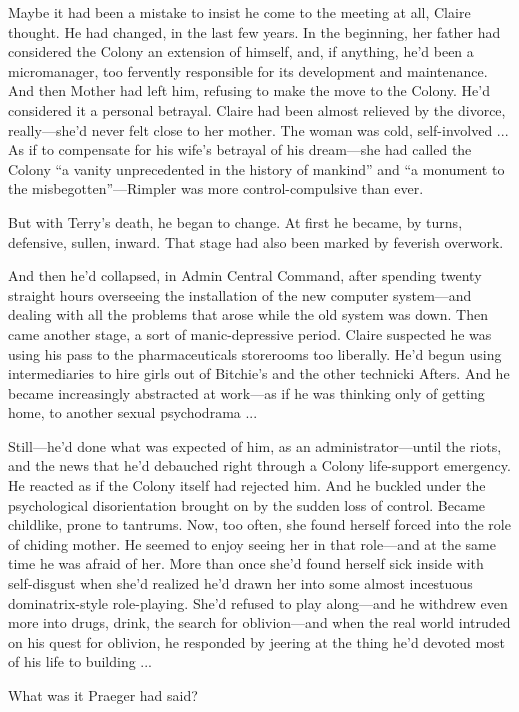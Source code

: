 Maybe it had been a mistake to insist he come to the meeting at all, Claire thought. He had changed, in the last few years. In the beginning, her father had considered the Colony an extension of himself, and, if anything, he'd been a micromanager, too fervently responsible for its development and maintenance. And then Mother had left him, refusing to make the move to the Colony. He'd considered it a personal betrayal. Claire had been almost relieved by the divorce, really—she'd never felt close to her mother. The woman was cold, self-involved ... As if to compensate for his wife's betrayal of his dream—she had called the Colony ``a vanity unprecedented in the history of mankind'' and ``a monument to the misbegotten''—Rimpler was more control-compulsive than ever.

But with Terry's death, he began to change. At first he became, by turns, defensive, sullen, inward. That stage had also been marked by feverish overwork.

And then he'd collapsed, in Admin Central Command, after spending twenty straight hours overseeing the installation of the new computer system—and dealing with all the problems that arose while the old system was down. Then came another stage, a sort of manic-depressive period. Claire suspected he was using his pass to the pharmaceuticals storerooms too liberally. He'd begun using intermediaries to hire girls out of Bitchie's and the other technicki Afters. And he became increasingly abstracted at work—as if he was thinking only of getting home, to another sexual psychodrama ...

Still—he'd done what was expected of him, as an administrator—until the riots, and the news that he'd debauched right through a Colony life-support emergency. He reacted as if the Colony itself had rejected him. And he buckled under the psychological disorientation brought on by the sudden loss of control. Became childlike, prone to tantrums. Now, too often, she found herself forced into the role of chiding mother. He seemed to enjoy seeing her in that role—and at the same time he was afraid of her. More than once she'd found herself sick inside with self-disgust when she'd realized he'd drawn her into some almost incestuous dominatrix-style role-playing. She'd refused to play along—and he withdrew even more into drugs, drink, the search for oblivion—and when the real world intruded on his quest for oblivion, he responded by jeering at the thing he'd devoted most of his life to building ...

What was it Praeger had said?

